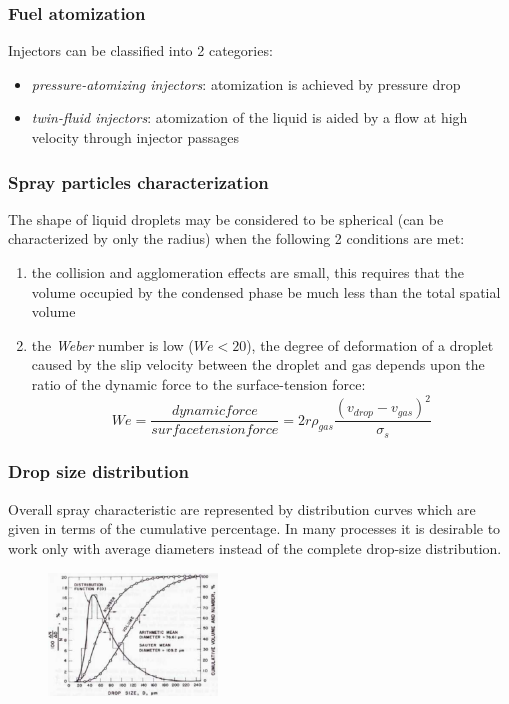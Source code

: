 \documentclass[12pt]{article}
\begin{document}
\subsubsection{Fuel atomization}

Injectors can be classified into 2 categories:

\begin{itemize}
    \item \textit{pressure-atomizing injectors}: atomization is achieved by pressure drop
    \item \textit{twin-fluid injectors}: atomization of the liquid is aided by a flow at high velocity through injector passages
\end{itemize}


\subsubsection{Spray particles characterization}

The shape of liquid droplets may be considered to be spherical (can be characterized by only the radius) when the following 2 conditions are met:
\begin{enumerate}
    \item the collision and agglomeration effects are small, this requires that the volume occupied by the condensed phase be much less than the total spatial volume
    \item the \textit{Weber} number is low ($We<20$), the degree of deformation of a droplet caused by the slip velocity between the droplet and gas depends upon the ratio of the dynamic force to the surface-tension force:
    \begin{equation}
        We = \frac{dynamic force}{surface tension force} = 2r\rho_{gas}\frac{(v_{drop}-v_{gas})^{2}}{\sigma_{s}}
    \end{equation}
\end{enumerate}

\subsubsection{Drop size distribution}

Overall spray characteristic are represented by distribution curves which are given in terms of the cumulative percentage. In many processes it is desirable to work only with average diameters instead of the complete drop-size distribution.

\begin{figure}[!ht]
\centering
\includegraphics[width=0.4\textwidth]{figures/distribution.png}
\end{figure}
\end{document}
